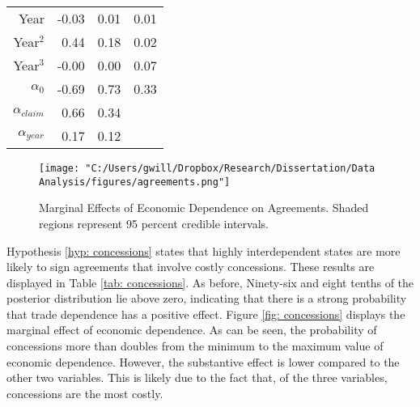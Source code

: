 \begin{table}[ht]
\begin{tabular}{rrrr}
			Year & -0.03 & 0.01 & 0.01 \\ 
			
			Year$^2$ & 0.44 & 0.18 & 0.02 \\ 
			
			Year$^3$ & -0.00 & 0.00 & 0.07 \\ 
			
			$\alpha_0$ & -0.69 & 0.73 & 0.33 \\ 
			
			$\alpha_{claim}$ & 0.66 & 0.34 &  \\ 
			
			$\alpha_{year}$ & 0.17 & 0.12 &  \\ 
		\bottomrule
		\end{tabular}
\end{table}



\begin{figure}
	\caption{Marginal Effects of Economic Dependence on Agreements. Shaded regions represent 95 percent credible intervals.}
	\label{fig: agreements}
	\texttt{[image: "C:/Users/gwill/Dropbox/Research/Dissertation/Data Analysis/figures/agreements.png"]}
\end{figure}

Hypothesis \ref{hyp: concessions} states that highly interdependent states are more likely to sign agreements that involve costly concessions. These results are displayed in Table \ref{tab: concessions}. As before, Ninety-six and eight tenths of the posterior distribution lie above zero, indicating that there is a strong probability that trade dependence has a positive effect. Figure \ref{fig: concessions} displays the marginal effect of economic dependence. As can be seen, the probability of concessions more than doubles from the minimum to the maximum value of economic dependence. However, the substantive effect is lower compared to the other two variables. This is likely due to the fact that, of the three variables, concessions are the most costly.

